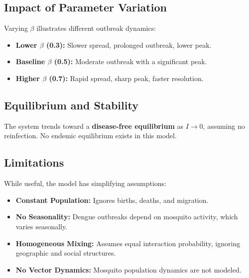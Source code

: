 \documentclass {article}
\begin{document}
\subsection*{Impact of Parameter Variation}
Varying $\beta$ illustrates different outbreak dynamics:
\begin{itemize}
    \item \textbf{Lower $\beta$ (0.3):} Slower spread, prolonged outbreak, lower peak.
    \item \textbf{Baseline $\beta$ (0.5):} Moderate outbreak with a significant peak.
    \item \textbf{Higher $\beta$ (0.7):} Rapid spread, sharp peak, faster resolution.
\end{itemize}

\subsection*{Equilibrium and Stability}
The system trends toward a \textbf{disease-free equilibrium} as $I \to 0$, assuming no reinfection. No endemic equilibrium exists in this model.

\subsection*{Limitations}
While useful, the model has simplifying assumptions:
\begin{itemize}
    \item \textbf{Constant Population:} Ignores births, deaths, and migration.
    \item \textbf{No Seasonality:} Dengue outbreaks depend on mosquito activity, which varies seasonally.
    \item \textbf{Homogeneous Mixing:} Assumes equal interaction probability, ignoring geographic and social structures.
    \item \textbf{No Vector Dynamics:} Mosquito population dynamics are not modeled.
\end{itemize}
\end{document}
